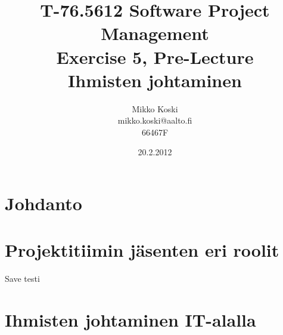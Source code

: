 \documentclass[a4paper]{article}
\begin{document}
\title{\small T-76.5612 Software Project Management \\ Exercise 5, Pre-Lecture \\ \huge Ihmisten johtaminen}
\date{20.2.2012}
\author{Mikko Koski \\ mikko.koski@aalto.fi \\ 66467F}
\maketitle

\normalsize

\section{Johdanto}

\section{Projektitiimin jäsenten eri roolit}



Save testi








\section{Ihmisten johtaminen IT-alalla}



\citep{grosjean2010}
\citep{appelo2012}
\citep{rsaanimate}
\citep{adkins2010}
\citep{augustine2005}
\citep{mcconnell1996}



\end{document}

